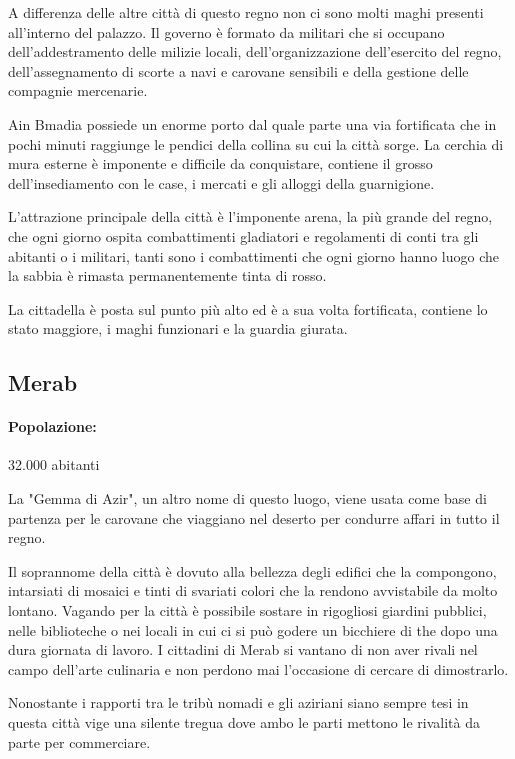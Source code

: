\documentclass[letterpaper,twocolumn,openany,nodeprecatedcode]{dndbook}
\begin{document}
A differenza delle altre città di questo regno non ci sono molti maghi presenti all'interno del palazzo. Il governo è formato da militari che si occupano dell'addestramento delle milizie locali, dell'organizzazione dell'esercito del regno, dell'assegnamento di scorte a navi e carovane sensibili e della gestione delle compagnie mercenarie.

Ain Bmadia possiede un enorme porto dal quale parte una via fortificata che in pochi minuti raggiunge le pendici della collina su cui la città sorge. La cerchia di mura esterne è imponente e difficile da conquistare, contiene il grosso dell'insediamento con le case, i mercati e gli alloggi della guarnigione.

L'attrazione principale della città è l'imponente arena, la più grande del regno, che ogni giorno ospita combattimenti gladiatori e regolamenti di conti tra gli abitanti o i militari, tanti sono i combattimenti che ogni giorno hanno luogo che la sabbia è rimasta permanentemente tinta di rosso.

La cittadella è posta sul punto più alto ed è a sua volta fortificata, contiene lo stato maggiore, i maghi funzionari e la guardia giurata.

\subsection{Merab}
\paragraph{Popolazione:} 32.000 abitanti

La "Gemma di Azir", un altro nome di questo luogo, viene usata come base di partenza per le carovane che viaggiano nel deserto per condurre affari in tutto il regno.

Il soprannome della città è dovuto alla bellezza degli edifici che la compongono, intarsiati di mosaici e tinti di svariati colori che la rendono avvistabile da molto lontano. Vagando per la città è possibile sostare in rigogliosi giardini pubblici, nelle biblioteche o nei locali in cui ci si può godere un bicchiere di the dopo una dura giornata di lavoro.
I cittadini di Merab si vantano di non aver rivali nel campo dell'arte culinaria e non perdono mai l'occasione di cercare di dimostrarlo.

Nonostante i rapporti tra le tribù nomadi e gli aziriani siano sempre tesi in questa città vige una silente tregua dove ambo le parti mettono le rivalità da parte per commerciare.
\end{document}
